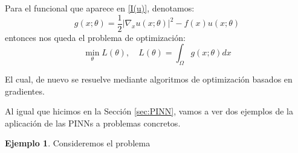 \documentclass[a4paper,11pt,spanish, twoside, leqno]{tfg-uam}
\theoremstyle{definition}
\newtheorem{exmp}[teor]{Ejemplo}
\begin{document}
Para el funcional que aparece en \eqref{I(u)}, denotamos:
\begin{equation}
g(x; \theta) = \frac 12 |\nabla_x u(x; \theta)|^2 - f(x) u(x; \theta)
\end{equation}
entonces nos queda el problema de optimización:
\begin{equation}
\min_\theta L(\theta), \quad L(\theta) = \int_\Omega g(x; \theta) dx
\label{integral}
\end{equation}

El cual, de nuevo se resuelve mediante algoritmos de optimización basados en gradientes.

Al igual que hicimos en la Sección \ref{sec:PINN}, vamos a ver dos ejemplos de la aplicación de las PINNs a problemas concretos. 
\begin{mdframed}  
\begin{exmp}
    Consideremos el problema 
    

\end{exmp}
\end{mdframed}
\end{document}
